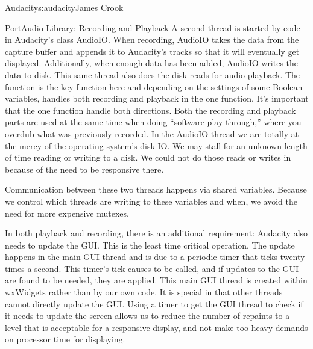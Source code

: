 \begin{aosachapter}{Audacity}{s:audacity}{James Crook}
\begin{aosasect1}{PortAudio Library: Recording and Playback}
A second thread is started by code in Audacity's class AudioIO\@.  When
recording, AudioIO takes the data from the capture buffer and appends
it to Audacity's tracks so that it will eventually get displayed.
Additionally, when enough data has been added, AudioIO writes the data
to disk.  This same thread also does the disk reads for audio
playback.  The function  is the key
function here and depending on the settings of some Boolean variables,
handles both recording and playback in the one function.  It's
important that the one function handle both directions.  Both the
recording and playback parts are used at the same time when doing
``software play through,'' where you overdub what was previously
recorded.  In the AudioIO thread we are totally at the mercy of the
operating system's disk IO\@.  We may stall for an unknown length of
time reading or writing to a disk.  We could not do those reads or
writes in  because of the need to be
responsive there.

Communication between these two threads happens via shared variables.
Because we control which threads are writing to these variables and
when, we avoid the need for more expensive mutexes.

\pagebreak

In both playback and recording, there is an additional requirement:
Audacity also needs to update the GUI\@.  This is the least time
critical operation.  The update happens in the main GUI thread and is
due to a periodic timer that ticks twenty times a second.  This
timer's tick causes  to be called, and if
updates to the GUI are found to be needed, they are applied.  This
main GUI thread is created within wxWidgets rather than by our own
code.  It is special in that other threads cannot directly update the
GUI\@.  Using a timer to get the GUI thread to check if it needs to
update the screen allows us to reduce the number of repaints to a
level that is acceptable for a responsive display, and not make too
heavy demands on processor time for displaying.


\end{aosasect1}
\end{aosachapter}
